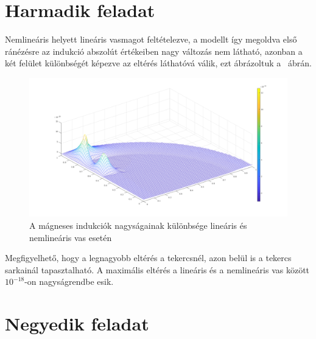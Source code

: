\section{Harmadik feladat}
Nemlineáris helyett lineáris vasmagot feltételezve, a modellt így megoldva első ránézésre az indukció abszolút értékeiben nagy változás nem látható, azonban a két felület különbségét képezve az eltérés láthatóvá válik, ezt ábrázoltuk a ~ábrán.

\begin{figure}[!h]
	\centering
	\includegraphics[width=150mm, keepaspectratio]{figures/terek/kulonbseg}
	\caption{A mágneses indukciók nagyságainak különbsége lineáris és nemlineáris vas esetén}
	\label{fig:kulonbseg}
\end{figure}

Megfigyelhető, hogy a legnagyobb eltérés a tekercsnél, azon belül is a tekercs sarkainál tapasztalható. A maximális eltérés a lineáris és a nemlineáris vas között $ 10^{-18} $-on nagyságrendbe esik.




\section{Negyedik feladat}

